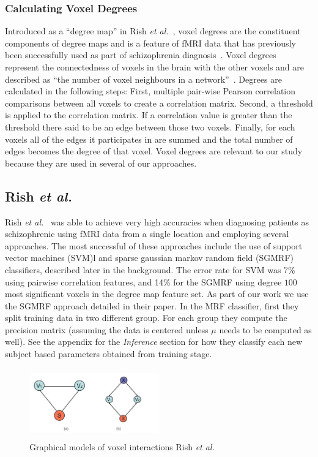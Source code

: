 \documentclass{article} %
\begin{document}
\subsubsection{Calculating Voxel Degrees}
Introduced as a ``degree map'' in Rish 
\emph{et al.}~\cite{rish2009discriminative}, voxel degrees are the constituent
components of degree maps and is a feature of fMRI data that has previously
been successfully used as part of schizophrenia diagnosis~\cite{Rish_2013}.
Voxel degrees represent the connectedness of voxels in the brain with the 
other voxels and are described as ``the number of voxel neighbours in a 
network''~\cite{Rish_2013}. Degrees are calculated in the following steps:
First, multiple pair-wise Pearson correlation comparisons between all voxels to 
create a correlation matrix. Second, a threshold is applied to the correlation
matrix. If a correlation value is greater than the threshold there said to be
an edge between those two voxels. Finally, for each voxels all of the edges
it participates in are summed and the total number of edges becomes the 
degree of that voxel. Voxel degrees are relevant to our study because they
are used in several of our approaches.

\subsection{Rish \emph{et al.}}
Rish \emph{et al.}~\cite{Rish_2013} was able to achieve very high accuracies 
when diagnosing patients as schizophrenic using fMRI data from a 
single location and employing several approaches. The most successful of these
approaches include the use of support vector machines (SVM)l and sparse 
gaussian markov random field (SGMRF) classifiers, described later in the 
background. The error rate for SVM was 7\% using pairwise correlation features, 
and 14\% for the SGMRF using degree $100$ most significant voxels in the 
degree map feature set. As part of our work we use the SGMRF approach
detailed in their paper. In the MRF classifier, first they split training data 
in two different group. For each group they compute the precision matrix 
(assuming the data is centered unless $\mu$ needs to be computed as well). 
See the appendix for the \textit{Inference} section for how they classify each 
new subject based parameters obtained from training stage.

\begin{figure}
  \begin{center}
  \includegraphics[width=0.5\textwidth, height=3.0cm]{diagrams/voxel.jpg}
  \caption{Graphical models of voxel interactions Rish \emph{et al.}}
  \label{voxel}
  \end{center}
\end{figure} 
\end{document}
